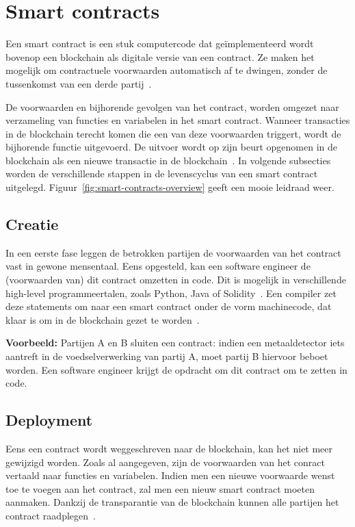 \section{Smart contracts}

Een smart contract is een stuk computercode dat geïmplementeerd wordt bovenop een blockchain als digitale versie van een contract. Ze maken het mogelijk om contractuele voorwaarden automatisch af te dwingen, zonder de tussenkomst van een derde partij~\autocite{Salem2008}.

De voorwaarden en bijhorende gevolgen van het contract, worden omgezet naar verzameling van functies en variabelen in het smart contract. Wanneer transacties in de blockchain terecht komen die een van deze voorwaarden triggert, wordt de bijhorende functie uitgevoerd. De uitvoer wordt op zijn beurt opgenomen in de blockchain als een nieuwe transactie in de blockchain~\autocite{Zheng2019}. In volgende subsecties worden de verschillende stappen in de levenscyclus van een smart contract uitgelegd. Figuur~\ref{fig:smart-contracts-overview} geeft een mooie leidraad weer.

\subsection{Creatie}

In een eerste fase leggen de betrokken partijen de voorwaarden van het contract vast in gewone mensentaal. Eens opgesteld, kan een software engineer de (voorwaarden van) dit contract omzetten in code. Dit is mogelijk in verschillende high-level programmeertalen, zoals Python, Java of Solidity~\autocite{Bahga2016}. Een compiler zet deze statements om naar een smart contract onder de vorm machinecode, dat klaar is om in de blockchain gezet te worden~\autocite{Zheng2019}.

\textbf{Voorbeeld:}
Partijen A en B sluiten een contract: indien een metaaldetector iets aantreft in de voedselverwerking van partij A, moet partij B hiervoor beboet worden. Een software engineer krijgt de opdracht om dit contract om te zetten in code.

\subsection{Deployment}

Eens een contract wordt weggeschreven naar de blockchain, kan het niet meer gewijzigd worden. Zoals al aangegeven, zijn de voorwaarden van het conract vertaald naar functies en variabelen. Indien men een nieuwe voorwaarde wenst toe te voegen aan het contract, zal men een nieuw smart contract moeten aanmaken. Dankzij de transparantie van de blockchain kunnen alle partijen het contract raadplegen~\autocite{Zheng2019}.


